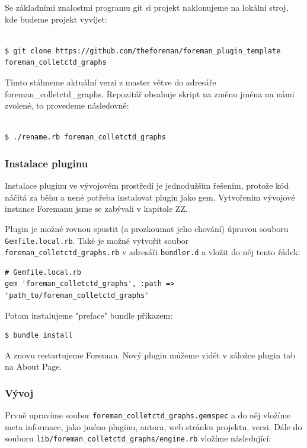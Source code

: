 \documentclass[thesis=B,czech]{FITthesis}[2012/06/26]
\begin{document}
Se základními znalostmi programu git si projekt naklonujeme na lokální stroj, kde budeme projekt vyvíjet:
\begin{verbatim}

$ git clone https://github.com/theforeman/foreman_plugin_template foreman_colletctd_graphs
\end{verbatim}

Tímto stáhneme aktuální verzi z master větve do adresáře foreman\_colletctd\_graphs. Repozitář obsahuje skript na změnu jména na námi zvolené, to provedeme následovně:
\begin{verbatim}

$ ./rename.rb foreman_colletctd_graphs
\end{verbatim}



\subsubsection{Instalace pluginu}

Instalace pluginu ve vývojovém prostředí je jednodužším řešením, protože kód náčítá za běhu a nené potřeba instalovat plugin jako gem. Vytvořením vývojové instance Foremanu jsme se zabývali v kapitole ZZ.

Plugin je možné rovnou spustit (a prozkoumat jeho chování) úpravou souboru \texttt{Gemfile.local.rb}. Také je možné vytvořit soubor \texttt{foreman\_colletctd\_graphs.rb} v adresáři \texttt{bundler.d} a vložit do něj tento řádek:

\begin{verbatim}
# Gemfile.local.rb
gem 'foreman_colletctd_graphs', :path => 'path_to/foreman_colletctd_graphs'
\end{verbatim}

Potom instalujeme "preface" bundle příkazem:
\begin{verbatim}
$ bundle install
\end{verbatim}

A znovu restartujeme Foreman. Nový plugin můžeme vidět v záložce plugin tab na About Page.

\subsubsection{Vývoj}

Prvně upravíme soubor \texttt{foreman_colletctd_graphs.gemspec} a do něj vložíme meta informace, jako jméno pluginu, autora, web stránku projektu, verzi. Dále do souboru \texttt{lib/foreman_colletctd_graphs/engine.rb} vložíme následující:
\end{document}
